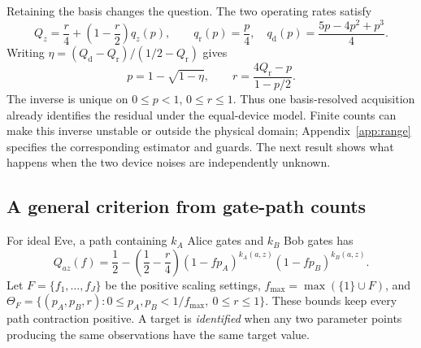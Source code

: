 \documentclass[manuscript,screen,review,anonymous]{acmart}
\begin{document}
Retaining the basis changes the question. The two operating rates satisfy
\begin{equation}
 Q_z=\frac r4+\left(1-\frac r2\right)q_z(p),\qquad
 q_{\mathrm r}(p)=\frac p4,\quad
 q_{\mathrm d}(p)=\frac{5p-4p^2+p^3}{4}.
 \label{eq:basis}
\end{equation}
Writing $\eta=(Q_{\mathrm d}-Q_{\mathrm r})/(1/2-Q_{\mathrm r})$ gives
\begin{equation}
 p=1-\sqrt{1-\eta},\qquad
 r=\frac{4Q_{\mathrm r}-p}{1-p/2}.
 \label{eq:basisinverse}
\end{equation}
The inverse is unique on $0\leq p<1$, $0\leq r\leq1$. Thus one basis-resolved
acquisition already identifies the residual under the equal-device model.
Finite counts can make this inverse unstable or outside the physical domain;
Appendix~\ref{app:range} specifies the corresponding estimator and guards.
The next result shows what happens when the two device noises are independently unknown.

\subsection{A general criterion from gate-path counts}
For ideal Eve, a path containing $k_A$ Alice gates and $k_B$ Bob gates has
\begin{equation}
 Q_{az}(f)=\frac12-\left(\frac12-\frac r4\right)
 (1-fp_A)^{k_A(a,z)}(1-fp_B)^{k_B(a,z)}.
 \label{eq:attack}
\end{equation}
Let $F=\{f_1,\ldots,f_J\}$ be the positive scaling settings,
$f_{\max}=\max(\{1\}\cup F)$, and
$\Theta_F=\{(p_A,p_B,r):0\leq p_A,p_B<1/f_{\max},\ 0\leq r\leq1\}$.
These bounds keep every path contraction positive. A target is
\emph{identified} when any two parameter points producing the same observations
have the same target value.
\end{document}
